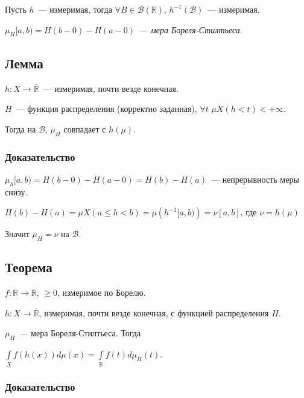 \documentclass{article}
\begin{document}
            Пусть $h$~--- измеримая, тогда $\forall B \in \mathcal{B} \left( \mathbb{R} \right)$, $h^{-1} \left( \mathcal{B} \right)$~--- измеримая.
    
            $\mu_H[a, b) = H(b - 0) - H(a - 0)$~--- \textit{мера Бореля-Стилтьеса}.
    
        \subsection{Лемма}
    
            $h : X \rightarrow \overline{\mathbb{R}}$~--- измеримая, почти везде конечная.
        
            $H$~--- функция распределения (корректно заданная), $\forall t$ $\mu X(h < t) < +\infty$.
        
            Тогда на $\mathcal{B}$, $\mu_H$ совпадает с $h(\mu)$.
        
        \subsubsection{Доказательство}
        
            $\mu_h[a, b) = H(b - 0) - H(a - 0) = H(b) - H(a)$~--- непрерывность меры снизу.
            
            $H(b) - H(a) = \mu X(a \leqslant h < b) = \mu \left( h^{-1} [a, b) \right) = \nu [a, b]$, где $\nu = h(\mu)$
            
            Значит $\mu_H = \nu$ на $\mathcal{B}$.
            
        \subsection{Теорема}
    
            $f : \mathbb{R} \rightarrow \mathbb{R}$, $\geqslant 0$, измеримое по Борелю.
        
            $h : X \rightarrow \overline{\mathbb{R}}$, измеримая, почти везде конечная, с функцией распределения $H$.
        
            $\mu_H$~--- мера Бореля-Стилтьеса. Тогда
        
            $\int\limits_X f \left( h(x) \right) d \mu(x) = \int\limits_{\mathbb{R}} f(t) d \mu_H (t)$.
        
        \subsubsection{Доказательство}
        
\end{document}
